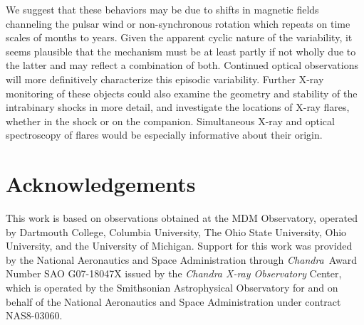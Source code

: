 \documentclass[iop]{emulateapj}
\newcommand{\chandra}{{\it Chandra}}
\begin{document}
We suggest that these behaviors may be due to shifts in magnetic 
fields channeling the pulsar wind or non-synchronous rotation which
repeats on time scales of months to years.  Given the apparent cyclic
nature of the variability, it seems plausible that the mechanism
must be at least partly if not wholly due to the latter and may reflect
a combination of both. Continued optical observations will more
definitively characterize this episodic variability.
Further X-ray monitoring of these objects could also examine
the geometry and stability of the intrabinary shocks in more
detail, and investigate the locations of X-ray flares, whether in
the shock or on the companion.  Simultaneous X-ray and optical
spectroscopy of flares would be especially informative about their
origin.

\section{Acknowledgements}

This work is based on observations obtained at the MDM Observatory,
operated by Dartmouth College, Columbia University, The Ohio State University,
Ohio University, and the University of Michigan.  Support for this work was
provided by the National Aeronautics and Space Administration through
\chandra\ Award Number SAO G07-18047X issued by the
{\it Chandra X-ray Observatory} Center,
which is operated by the Smithsonian Astrophysical Observatory for and on
behalf of the National Aeronautics and Space Administration under contract
NAS8-03060.
\end{document}
